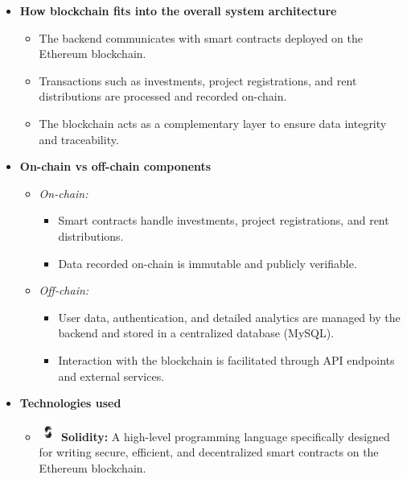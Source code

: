 \begin{itemize}
    \item \textbf{How blockchain fits into the overall system architecture}
    \begin{itemize}
        \item The backend communicates with smart contracts deployed on the Ethereum blockchain.
        \item Transactions such as investments, project registrations, and rent distributions are processed and recorded on-chain.
        \item The blockchain acts as a complementary layer to ensure data integrity and traceability.
    \end{itemize}

    \item \textbf{On-chain vs off-chain components}
    \begin{itemize}
        \item \textit{On-chain:}
        \begin{itemize}
            \item Smart contracts handle investments, project registrations, and rent distributions.
            \item Data recorded on-chain is immutable and publicly verifiable.
        \end{itemize}
        \item \textit{Off-chain:}
        \begin{itemize}
            \item User data, authentication, and detailed analytics are managed by the backend and stored in a centralized database (MySQL).
            \item Interaction with the blockchain is facilitated through API endpoints and external services.
        \end{itemize}
    \end{itemize}

    \item \textbf{Technologies used}
   \begin{itemize}
    \item \includegraphics[width=0.05\textwidth]{images/icons/solidity.png} \textbf{Solidity:} A high-level programming language specifically designed for writing secure, efficient, and decentralized smart contracts on the Ethereum blockchain.
    

\end{itemize}
\end{itemize}
